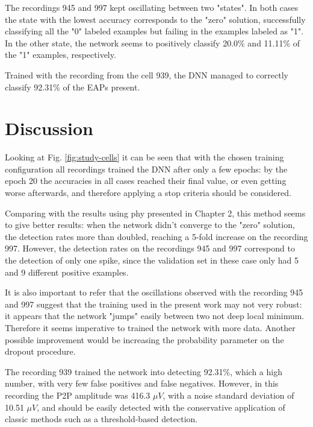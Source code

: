 The recordings 945 and 997 kept oscillating between two "states". In both cases the state with the lowest accuracy corresponds to the "zero" solution, successfully classifying all the "0" labeled examples but failing in the examples labeled as "1". In the other state, the network seems to positively classify 20.0\% and 11.11\% of the "1" examples, respectively.

Trained with the recording from the cell 939, the DNN managed to correctly classify 92.31\% of the EAPs present. 

\section{Discussion}


Looking at Fig. \ref{fig:study-cells} it can be seen that with the chosen training configuration all recordings trained the DNN after only a few epochs: by the epoch 20 the accuracies in all cases reached their final value, or even getting worse afterwards, and therefore applying a stop criteria should be considered.

Comparing with the results using phy presented in Chapter 2, this method seems to give better results: when the network didn't converge to the "zero" solution, the detection rates more than doubled, reaching a 5-fold increase on the recording 997. However, the detection rates on the recordings 945 and 997 correspond to the detection of only one spike, since the validation set in these case only had 5 and 9 different positive examples. 

It is also important to refer that the oscillations observed with the recording 945 and 997 suggest that the training used in the present work may not very robust: it appears that the network "jumps" easily between two not deep local minimum. Therefore it seems imperative to trained the network with more data. Another possible improvement would be increasing the probability parameter on the dropout procedure.

The recording 939 trained the network into detecting 92.31\%, which a high number, with very few false positives and false negatives. However, in this recording the P2P amplitude was 416.3 $\mu V$, with a noise standard deviation of 10.51 $\mu V$, and should be easily detected with the conservative application of classic methods such as a threshold-based detection.

